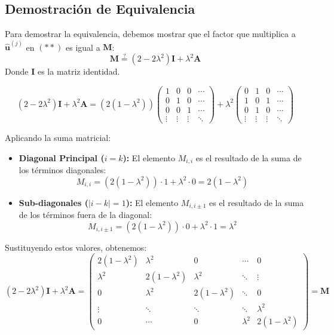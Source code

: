 \documentclass{replab}
\begin{document}
\subsection*{Demostración de Equivalencia}

Para demostrar la equivalencia, debemos mostrar que el factor que multiplica a $\mathbf{\hat{u}}^{(j)}$ en $(**)$ es igual a $\mathbf{M}$:
$$ \mathbf{M} \stackrel{?}{=} (2 - 2\lambda^2) \mathbf{I} + \lambda^2 \mathbf{A} $$
Donde $\mathbf{I}$ es la matriz identidad.

$$ (2 - 2\lambda^2) \mathbf{I} + \lambda^2 \mathbf{A} = (2(1-\lambda^2))
\begin{pmatrix}
1 & 0 & 0 & \cdots \\
0 & 1 & 0 & \cdots \\
0 & 0 & 1 & \cdots \\
\vdots & \vdots & \vdots & \ddots
\end{pmatrix} 
+ \lambda^2
\begin{pmatrix}
0 & 1 & 0 & \cdots \\
1 & 0 & 1 & \cdots \\
0 & 1 & 0 & \cdots \\
\vdots & \vdots & \vdots & \ddots
\end{pmatrix} $$

Aplicando la suma matricial:

\begin{itemize}
    \item \textbf{Diagonal Principal ($i=k$):} El elemento $M_{i,i}$ es el resultado de la suma de los términos diagonales:
    $$ M_{i,i} = (2(1-\lambda^2)) \cdot 1 + \lambda^2 \cdot 0 = 2(1 - \lambda^2) $$
    \item \textbf{Sub-diagonales ($|i-k|=1$):} El elemento $M_{i,i\pm 1}$ es el resultado de la suma de los términos fuera de la diagonal:
    $$ M_{i,i\pm 1} = (2(1-\lambda^2)) \cdot 0 + \lambda^2 \cdot 1 = \lambda^2 $$
\end{itemize}

Sustituyendo estos valores, obtenemos:
$$ (2 - 2\lambda^2) \mathbf{I} + \lambda^2 \mathbf{A} = 
\begin{pmatrix}
2(1 - \lambda^2) & \lambda^2 & 0 & \cdots & 0 \\
\lambda^2 & 2(1 - \lambda^2) & \lambda^2 & \ddots & \vdots \\
0 & \lambda^2 & 2(1 - \lambda^2) & \ddots & 0 \\
\vdots & \ddots & \ddots & \ddots & \lambda^2 \\
0 & \cdots & 0 & \lambda^2 & 2(1 - \lambda^2)
\end{pmatrix} = \mathbf{M} $$
\end{document}
